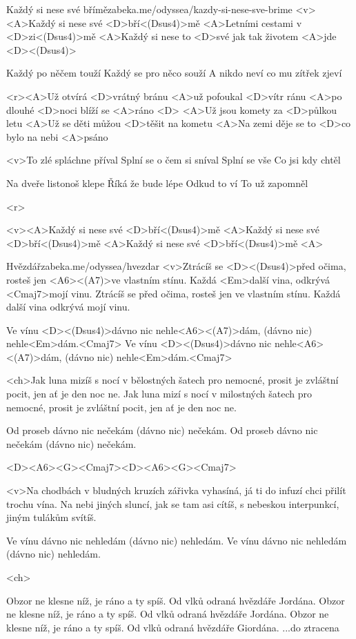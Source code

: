 \begin{song}{55}{Každý si nese své břímě}{zabeka.me/odyssea/kazdy-si-nese-sve-brime}
<v><A>Každý si nese své <D>bří<(Dsus4)>mě
<A>Letními cestami v <D>zi<(Dsus4)>mě
<A>Každý si nese to <D>své 
jak tak životem <A>jde <D><(Dsus4)>

Každý po něčem touží
Každý se pro něco souží
A nikdo neví
co mu zítřek zjeví

<r><A>Už otvírá <D>vrátný bránu
<A>už pofoukal <D>vítr ránu
<A>po dlouhé <D>noci blíží se <A>ráno <D>
<A>Už jsou komety za <D>půlkou letu
<A>Už se děti můžou <D>těšit na kometu
<A>Na zemi děje se to <D>co bylo na nebi <A>psáno

<v>To zlé spláchne příval
Splní se o čem si sníval
Splní se vše
Co jsi kdy chtěl

Na dveře listonoš klepe
Říká že bude lépe
Odkud to ví
To už zapomněl

<r>

<v><A>Každý si nese své <D>bří<(Dsus4)>mě
<A>Každý si nese své <D>bří<(Dsus4)>mě
<A>Každý si nese své <D>bří<(Dsus4)>mě <A>
\end{song}
\begin{song}[UDG]{56}{Hvězdář}{zabeka.me/odyssea/hvezdar}
<v>Ztrácíš se <D><(Dsus4)>před očima, rosteš jen <A6><(A7)>ve vlastním stínu.
Každá <Em>další vina, odkrývá <Cmaj7>mojí vinu.
Ztrácíš se před očima, rosteš jen ve vlastním stínu.
Každá další vina odkrývá mojí vinu.

Ve vínu <D><(Dsus4)>dávno nic nehle<A6><(A7)>dám, (dávno nic) nehle<Em>dám.<Cmaj7>
Ve vínu <D><(Dsus4)>dávno nic nehle<A6><(A7)>dám, (dávno nic) nehle<Em>dám.<Cmaj7>

<ch>Jak luna mizíš s nocí v bělostných šatech pro nemocné,
prosit je zvláštní pocit, jen ať je den noc ne.
Jak luna mizí s nocí v milostných šatech pro nemocné,
prosit je zvláštní pocit, jen ať je den noc ne.

Od proseb dávno nic nečekám (dávno nic) nečekám.
Od proseb dávno nic nečekám (dávno nic) nečekám.

<D><A6><G><Cmaj7><D><A6><G><Cmaj7>

<v>Na chodbách v bludných kruzích zářivka vyhasíná,
já ti do infuzí chci přilít trochu vína.
Na nebi jiných sluncí, jak se tam asi cítíš,
s nebeskou interpunkcí, jiným tulákům svítíš.

Ve vínu dávno nic nehledám (dávno nic) nehledám.
Ve vínu dávno nic nehledám (dávno nic) nehledám.

<ch>

Obzor ne klesne níž, je ráno a ty spíš.
Od vlků odraná hvězdáře Jordána.
Obzor ne klesne níž, je ráno a ty spíš.
Od vlků odraná hvězdáře Jordána.
Obzor ne klesne níž, je ráno a ty spíš.
Od vlků odraná hvězdáře Giordána. ...do ztracena

\end{song}
